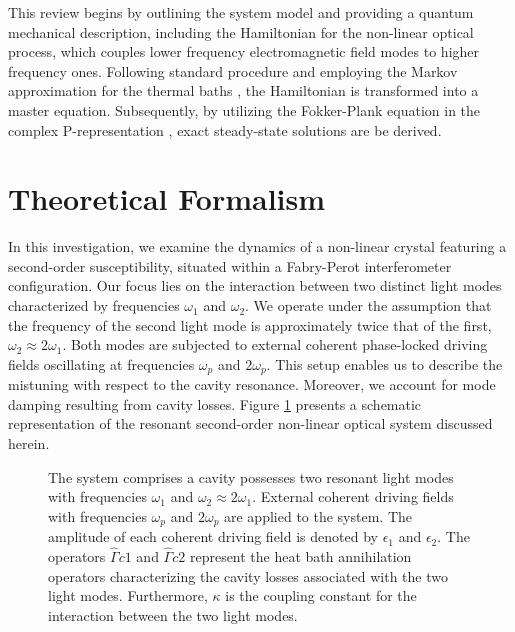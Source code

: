 \documentclass[fleqn,11pt]{wlscirep}
\begin{document}
This review begins by outlining the system model and providing a quantum mechanical description, including the Hamiltonian for the non-linear optical process, which couples lower frequency electromagnetic field modes to higher frequency ones. Following standard procedure and employing the Markov approximation for the thermal baths \cite{louisell1973,walls2008}, the Hamiltonian is transformed into a master equation. Subsequently, by utilizing the Fokker-Plank equation in the complex P-representation \cite{drummond1980}, exact steady-state solutions are be derived. 

\section*{Theoretical Formalism}

In this investigation, we examine the dynamics of a non-linear crystal featuring a second-order susceptibility, situated within a Fabry-Perot interferometer configuration. Our focus lies on the interaction between two distinct light modes characterized by frequencies $\omega_1$ and $\omega_2$. We operate under the assumption that the frequency of the second light mode is approximately twice that of the first, $\omega_2 \approx 2\omega_1$. Both modes are subjected to external coherent phase-locked driving fields oscillating at frequencies $\omega_p$ and $2\omega_p$. This setup enables us to describe the mistuning with respect to the cavity resonance. Moreover, we account for mode damping resulting from cavity losses. Figure \ref{fig_system} presents a schematic representation of the resonant second-order non-linear optical system discussed herein. 
\begin{figure}[!t]
	\centering
	\caption{The system comprises a cavity possesses two resonant light modes with frequencies $\omega_1$ and $\omega_2 \approx 2\omega_1$. External coherent driving fields with frequencies $\omega_p$ and $2\omega_p$ are applied to the system. The amplitude of each coherent driving field is denoted by $\epsilon_1$ and $\epsilon_2$. The operators $\hat{\Gamma}{c1}$ and $\hat{\Gamma}{c2}$ represent the heat bath annihilation operators characterizing the cavity losses associated with the two light modes. Furthermore, $\kappa$ is the coupling constant for the interaction between the two light modes.}
	\label{fig_system}
\end{figure}
\end{document}
